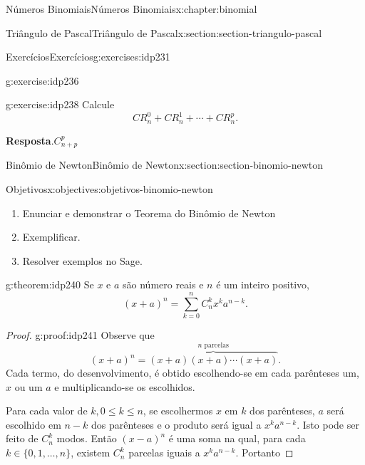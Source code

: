 \documentclass[oneside,10pt,]{book}
\newcommand{\blocktitlefont}{\relax}
\numberwithin{equation}{section}
\begin{document}
\begin{chapterptx}{Números Binomiais}{}{Números Binomiais}{}{}{x:chapter:binomial}
\begin{sectionptx}{Triângulo de Pascal}{}{Triângulo de Pascal}{}{}{x:section:section-triangulo-pascal}
\begin{exercises-subsection}{Exercícios}{}{Exercícios}{}{}{g:exercises:idp231}
\begin{divisionexercise}{3}{}{}{g:exercise:idp236}
\end{divisionexercise}%
\begin{divisionexercise}{4}{}{}{g:exercise:idp238}%
Calcule%
\begin{equation*}
CR_n^0 + CR_n^1+\cdots+ CR_n^p.
\end{equation*}
%
\par\smallskip%
\noindent\textbf{\blocktitlefont Resposta}.\hypertarget{g:answer:idp239}{}\quad{}\(C_{n+p}^p\)%
\end{divisionexercise}%
\end{exercises-subsection}
\end{sectionptx}
%
%
\typeout{************************************************}
\typeout{************************************************}
%
\begin{sectionptx}{Binômio de Newton}{}{Binômio de Newton}{}{}{x:section:section-binomio-newton}
\begin{objectives}{Objetivos}{x:objectives:objetivos-binomio-newton}
%
\begin{enumerate}
\item{}Enunciar e demonstrar o Teorema do Binômio de Newton%
\item{}Exemplificar.%
\item{}Resolver exemplos no Sage.%
\end{enumerate}
\end{objectives}
\begin{theorem}{}{}{g:theorem:idp240}%
Se \(x\) e \(a\) são número reais e \(n\) é um inteiro positivo,%
\begin{equation*}
(x+a)^n  = \sum_{k=0}^n C_n^k x^ka^{n-k}.
\end{equation*}
%
\end{theorem}
\begin{proof}{}{g:proof:idp241}
Observe que%
\begin{equation*}
(x+a)^n  = \overbrace{(x+a)(x+a)\cdots(x+a)}^{n \text{ parcelas}}.
\end{equation*}
Cada termo, do desenvolvimento, é obtido escolhendo-se em cada parênteses um, \(x\) ou um \(a\) e multiplicando-se os escolhidos.%
\par
Para cada valor de \(k, 0\leq k \leq n\), se escolhermos \(x\) em \(k\) dos parênteses, \(a\) será escolhido em \(n-k\) dos parênteses e o produto será igual a \(x^ka^{n-k}\). Isto pode ser feito de \(C_n^k\) modos. Então \((x-a)^n\) é uma soma na qual, para cada \(k\in\{0, 1, \ldots, n\}\), existem \(C_n^k\) parcelas iguais a \(x^ka^{n-k}\). Portanto%

\end{proof}
\end{sectionptx}
\end{chapterptx}
\end{document}
